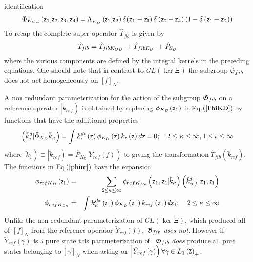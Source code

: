identification 
\begin{equation}
\Phi _{K_{OD}}\left( {\sf z}_{1,}{\sf z}_{2},{\sf z}_{3},{\sf z}_{4}\right)
=\Lambda _{_{K_{D}}}\left( {\sf z}_{1,}{\sf z}_{2}\right) \delta \left( {\sf %
z}_{1}-{\sf z}_{3}\right) \delta \left( {\sf z}_{2}-{\sf z}_{4}\right)
\left( 1-\delta \left( {\sf z}_{1}-{\sf z}_{2}\right) \right)
\end{equation}%
To recap the complete super operator $\hat{T}_{fib}$ is given by 
\begin{equation}
\hat{T}_{fib}=\hat{T}_{fibK_{OD}{\rm \ }}+\hat{T}_{fibK_{D}{\rm \ }}+\hat{P}%
_{S_{D}}
\end{equation}%
where the various components are defined by the integral kernels in the
preceding equations. One should note that in contrast to $GL\left( \ker \Xi
\right) $ the subgroup ${\frak G}_{fib}$ does not act homogeneously on $%
\left[ f\right] _{N}$.

A non redundant parameterization for the action of the subgroup ${\frak G}%
_{fib}$ on a reference operator $\left| \breve{k}_{ref}\right) $ is obtained
by replacing $\phi _{K_{D}}\left( {\sf z}_{1}\right) $ in Eq.$\left( \ref%
{PhiKD}\right) $ by functions that have the additional properties 
\begin{equation}
\left( \breve{k}_{i}^{d}|\hat{\Phi}_{K_{D}}\breve{k}_{\kappa }\right) =\int
k_{\iota }^{d\ast }\left( {\sf z}\right) \phi _{K_{D}}\left( {\sf z}\right)
k_{\kappa }\left( {\sf z}\right) d{\sf z}=0;\quad 2\leq \kappa \leq \infty
,1\leq \iota \leq \infty  \label{phinr}
\end{equation}%
where $\left| \breve{k}_{1}\right) \equiv \left| \breve{k}_{ref}\right) =%
\hat{P}_{K_{D}}\left| \breve{Y}_{ref}\left( f\right) \right) $ to giving the
transformation $\hat{T}_{fib}\left( \breve{k}_{ref}\right) $. The functions
in Eq.$\left( \ref{phinr}\right) $ have the expansion 
\begin{eqnarray}
\phi _{refK_{D}}\left( {\sf z}_{1}\right) &=&\sum_{2\leq \kappa \leq \infty
}\phi _{refK_{D\kappa }}\left( {\sf z}_{1},{\sf z}_{1}|\breve{k}_{\kappa
}\right) \left( \breve{k}_{ref}^{d}|{\sf z}_{1},{\sf z}_{1}\right)  \nonumber
\\
\phi _{refK_{D\kappa }} &=&\int k_{\kappa }^{d\ast }\left( {\sf z}%
_{1}\right) \phi _{K_{D}}\left( {\sf z}_{1}\right) k_{ref}\left( {\sf z}%
_{1}\right) d{\sf z}_{1};\quad 2\leq \kappa \leq \infty  \label{refkd}
\end{eqnarray}%
Unlike the non redundant parameterization of $GL\left( \ker \Xi \right) $,
which produced all of $\left[ f\right] _{N}$ from the reference operator $%
\breve{Y}_{ref}\left( f\right) ,$ ${\frak G}_{fib}$ {\it does not. }However
if $\breve{Y}_{ref}\left( \gamma \right) $ is a pure state this
parameterization of {\it \ }${\frak G}_{fib}$ {\it does }produce all pure
states belonging to $\left[ \gamma \right] _{N}$ when acting on $\left| 
\breve{Y}_{ref}\left( \gamma \right) \right) \forall \gamma \in L_{1}\left( 
{\tt Z}\right) _{+}$.

